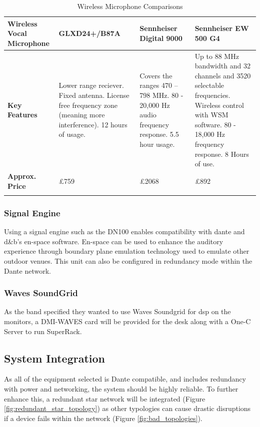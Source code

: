                 \begin{longtable}[c]{|p{1.5cm}|p{4.8cm}|p{4.8cm}|p{4.8cm}|}
                \hline
                \textbf{Wireless Vocal Microphone} &
                  \cellcolor[HTML]{FFCCC9}\textbf{GLXD24+/B87A} &
                  \cellcolor[HTML]{FFCCC9}\textbf{Sennheiser Digital 9000} &
                  \cellcolor[HTML]{9AFF99}\textbf{Sennheiser EW 500 G4} \\ \hline
                \endfirsthead
                \endhead
                \textbf{Key Features} &
                  \cellcolor[HTML]{FFCCC9}Lower range reciever. Fixed antenna. License free frequency zone (meaning more interference). 12 hours of usage. &
                  \cellcolor[HTML]{FFCCC9}Covers the ranges 470 – 798 MHz. 80 - 20,000 Hz audio frequency response. 5.5 hour usage. &
                  \cellcolor[HTML]{9AFF99}Up to 88 MHz bandwidth and 32 channels and 3520 selectable frequencies. Wireless control with WSM software. 80 - 18,000 Hz frequency response. 8 Hours of use. \\ \hline
                \textbf{Approx. Price} &
                  £759 &
                  £2068 &
                  £892 \\ \hline
                  \caption{Wireless Microphone Comparisons}
                    \label{tab:wireless_mic_comparisons}
                \end{longtable}

        \subsubsection{Signal Engine}
            Using a signal engine such as the DN100 enables compatibility with dante and d\&b's en-space software. En-space can be used to enhance the auditory experience through boundary plane emulation technology \citep{ds100} used to emulate other outdoor venues. This unit can also be configured in redundancy mode within the Dante network.

        \subsubsection{Waves SoundGrid}
            As the band specified they wanted to use Waves Soundgrid for \acrshort{dsp} on the monitors, a DMI-WAVES card will be provided for the desk along with a One-C Server to run SuperRack.
        
    \subsection{System Integration}
        As all of the equipment selected is Dante compatible, and includes redundancy with power and networking, the system should be highly reliable. To further enhance this, a redundant star network will be integrated (Figure \ref{fig:redundant_star_topology}) as other typologies can cause drastic disruptions if a device fails within the network (Figure \ref{fig:bad_topologies}).

